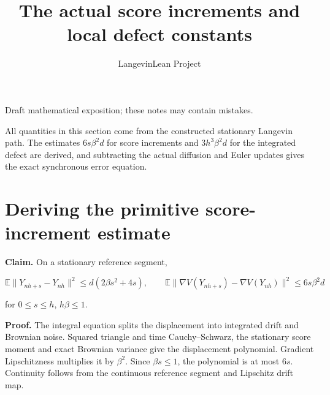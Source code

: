 \documentclass[11pt,a4paper]{article}
\title{\texorpdfstring{The actual score increments and local defect constants}{The actual score increments and local defect constants}}
\author{LangevinLean Project}
\date{}
\begin{document}
\maketitle
Draft mathematical exposition; these notes may contain mistakes.


All quantities in this section come from the constructed stationary Langevin path. The estimates \(6s\beta^2d\) for score increments and \(3h^3\beta^2d\) for the integrated defect are derived, and subtracting the actual diffusion and Euler updates gives the exact synchronous error equation.


\section{\texorpdfstring{Deriving the primitive score-increment estimate}{Deriving the primitive score-increment estimate}}


\textbf{Claim.} On a stationary reference segment,

\[\mathbb E\|Y_{nh+s}-Y_{nh}\|^2\le d(2\beta s^2+4s),\qquad \mathbb E\|\nabla V(Y_{nh+s})-\nabla V(Y_{nh})\|^2\le6s\beta^2d\]

for \(0\le s\le h\), \(h\beta\le1\).



\textbf{Proof.} The integral equation splits the displacement into integrated drift and Brownian noise. Squared triangle and time Cauchy–Schwarz, the stationary score moment and exact Brownian variance give the displacement polynomial. Gradient Lipschitzness multiplies it by \(\beta^2\). Since \(\beta s\le1\), the polynomial is at most \(6s\). Continuity follows from the continuous reference segment and Lipschitz drift map.
\end{document}
